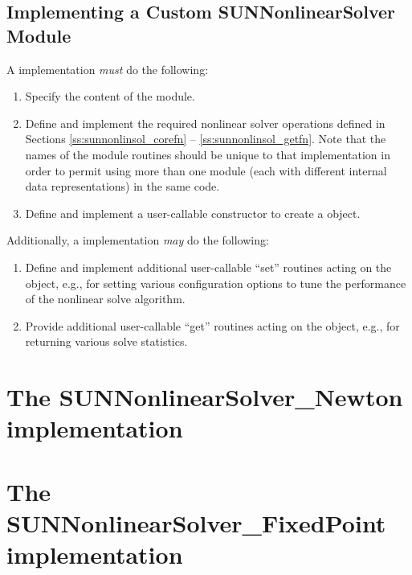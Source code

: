 \subsection{Implementing a Custom SUNNonlinearSolver Module}
\label{ss:sunnonlinsol_custom}

A {\sunnonlinsol} implementation \textit{must} do the following:
\begin{enumerate}
\item Specify the content of the {\sunnonlinsol} module.
\item Define and implement the required nonlinear solver operations
  defined in Sections \ref{ss:sunnonlinsol_corefn}
  -- \ref{ss:sunnonlinsol_getfn}. Note that the names of the module
  routines should be unique to that implementation in order to permit
  using more than one {\sunnonlinsol} module (each with different
   internal data representations) in
  the same code.
\item Define and implement a user-callable constructor to create a
   object.
\end{enumerate}
Additionally, a  implementation \textit{may} do
the following:
\begin{enumerate}
\item Define and implement additional user-callable ``set''
  routines acting on the  object, e.g., for
  setting various configuration options to tune the performance of
  the nonlinear solve algorithm.
\item Provide additional user-callable ``get'' routines acting on the
   object, e.g., for returning various solve
  statistics.
\end{enumerate}


\section{The SUNNonlinearSolver\_Newton implementation}
\label{s:sunnonlinsol_newton}


\section{The SUNNonlinearSolver\_FixedPoint implementation}
\label{s:sunnonlinsol_fixedpoint}

